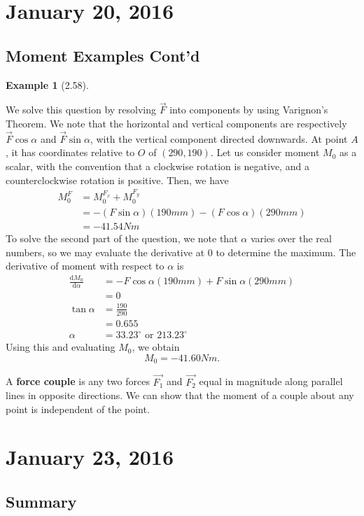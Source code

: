 \documentclass[11pt]{article}
\theoremstyle{plain} %
\theoremstyle{definition}
\theoremstyle{example}
\newtheorem*{example}{Example}
\theoremstyle{remark}
\begin{document}
\section{January 20, 2016}
\subsection{Moment Examples Cont'd}

\begin{example}[2.58]
\end{example}
We solve this question by resolving $\vec{F}$ into components by using Varignon's Theorem. We note that the horizontal and vertical components are respectively $\vec{F}\cos\alpha$ and $\vec{F}\sin\alpha$, with the vertical component directed downwards. At point $A$, it has coordinates relative to $O$ of $(290, 190)$. Let us consider moment $M_0$ as a scalar, with the convention that a clockwise rotation is negative, and a counterclockwise rotation is positive. Then, we have
\begin{align*}
M_0^F &= M_0^{F_x} + M_0^{F_y}\\
&= -(F\sin\alpha)(190mm) -(F\cos\alpha)(290mm)\\
&= -41.54Nm
\end{align*}
To solve the second part of the question, we note that $\alpha$ varies over the real numbers, so we may evaluate the derivative at $0$ to determine the maximum. The derivative of moment with respect to $\alpha$ is
\begin{align*}
\frac{\mathrm d M_0}{\mathrm d \alpha} &= -F\cos\alpha(190mm) +F\sin\alpha(290mm)\\
&= 0\\
\tan\alpha &= \frac{190}{290}\\
&= 0.655\\
\alpha &= 33.23^{\circ} \text{ or } 213.23^{\circ}
\end{align*}
Using this and evaluating $M_0$, we obtain $$M_0 = -41.60Nm.$$

A \textbf{force couple} is any two forces $\vec{F_1}$ and $\vec{F_2}$ equal in magnitude along parallel lines in opposite directions. We can show that the moment of a couple about any point is independent of the point.

\section{January 23, 2016}
\subsection{Summary}
\end{document}
